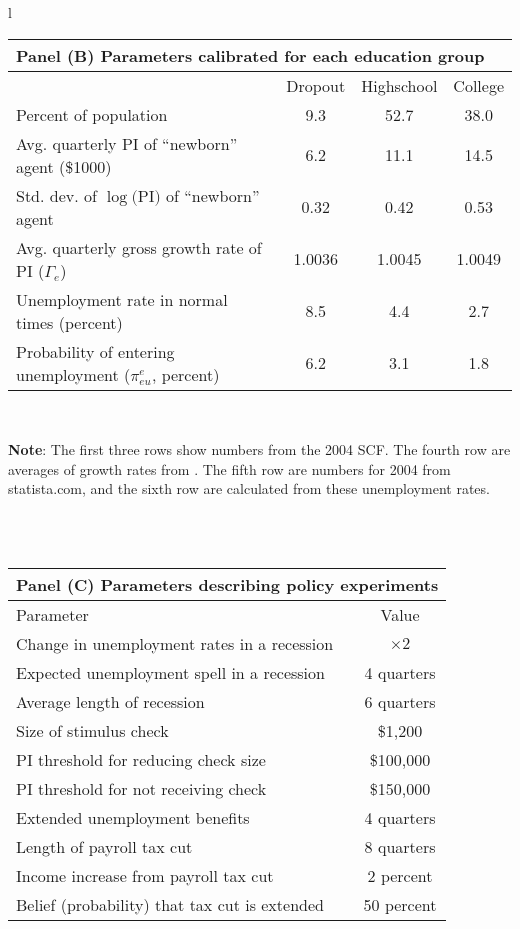 \documentclass[\econtexRoot/HAFiscal]{subfiles}
\begin{document}
{\begin{table}[p]
\begin{center}
\begin{tabular}{l}
        \begin{tabular}{lccc}
          \toprule 
          \multicolumn{4}{l}{Panel (B) Parameters calibrated for each education group} \\ \midrule
          & Dropout & Highschool & College \\ \midrule
          Percent of population & \phantom{0}9.3 & 52.7 & 38.0 \\ 
          Avg. quarterly PI of ``newborn'' agent (\$1000) & \phantom{0}6.2 & 11.1 & 14.5 \\
          Std. dev. of $\log($PI$)$ of ``newborn'' agent & 0.32 & 0.42 & 0.53 \\
          Avg. quarterly gross growth rate of PI ($\Gamma_e$) & 1.0036 & 1.0045 & 1.0049 \\
          Unemployment rate in normal times (percent) & \phantom{0}8.5 & \phantom{0}4.4 & \phantom{0}2.7 \\ 
          Probability of entering unemployment ($\pi_{eu}^{e}$, percent) & \phantom{0}6.2 & \phantom{0}3.1 & \phantom{0}1.8 
          \\ \bottomrule 
        \end{tabular} \\
        \parbox{16cm}{\small \vspace{.25cm} \textbf{Note}: The first three rows show numbers from the 2004 SCF. The fourth row are averages of growth rates from \cite{carroll2020modeling}. The fifth row are numbers for 2004 from statista.com, and the sixth row are calculated from these unemployment rates.\normalsize}
        \\ \\

        \begin{tabular}{lc}
          \toprule 
          \multicolumn{2}{l}{Panel (C) Parameters describing policy experiments} \\ \midrule 
          Parameter & Value \\ \midrule 
          Change in unemployment rates in a recession & $\times 2$ \\ 
          Expected unemployment spell in a recession & 4 quarters \\ 
          Average length of recession & 6 quarters \\ 
          Size of stimulus check & \$1,200 \\ 
          PI threshold for reducing check size & \$100,000 \\ 
          PI threshold for not receiving check & \$150,000 \\ 
          Extended unemployment benefits & 4 quarters \\
          Length of payroll tax cut & 8 quarters \\ 
          Income increase from payroll tax cut & 2 percent \\ 
          Belief (probability) that tax cut is extended & 50 percent 		
          \\ \bottomrule
        \end{tabular} 


\end{tabular}
\end{center}
\end{table}}
\end{document}
